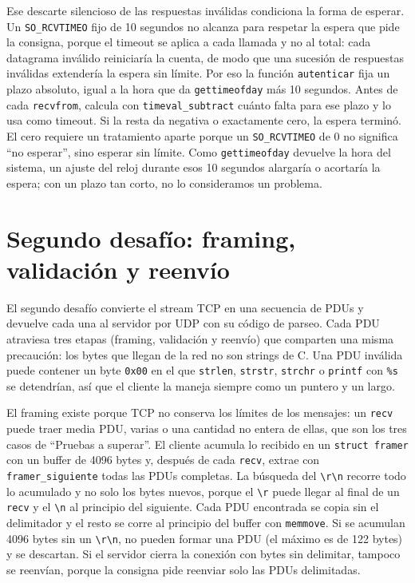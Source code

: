 \documentclass[11pt,a4paper]{article}
\newcommand{\code}[1]{\texttt{#1}}
\newcommand{\crlf}{\texttt{\textbackslash r\textbackslash n}}
\begin{document}
Ese descarte silencioso de las respuestas inválidas condiciona la forma de esperar. Un \code{SO\_RCVTIMEO} fijo de 10
segundos no alcanza para respetar la espera que pide la consigna, porque el timeout se aplica a cada llamada y no al
total: cada datagrama inválido reiniciaría la cuenta, de modo que una sucesión de respuestas inválidas extendería la espera sin
límite. Por eso la función \code{autenticar} fija un plazo absoluto, igual a la hora que da
\code{gettimeofday} más 10 segundos. Antes de cada \code{recvfrom}, calcula con \code{timeval\_subtract} cuánto falta para ese plazo y lo usa como timeout. Si la resta da negativa o exactamente cero, la
espera terminó. El cero requiere un tratamiento aparte porque un \code{SO\_RCVTIMEO} de 0 no significa ``no
esperar'', sino esperar sin límite. Como \code{gettimeofday} devuelve la hora del sistema, un ajuste del reloj durante
esos 10 segundos alargaría o acortaría la espera; con un plazo tan corto, no lo consideramos un problema.

\section{Segundo desafío: framing, validación y reenvío}
\label{sec:desafio2}

El segundo desafío convierte el stream TCP en una secuencia de PDUs y devuelve cada una al servidor por UDP con su
código de parseo. Cada PDU atraviesa tres etapas (framing, validación y reenvío) que comparten una misma precaución:
los bytes que llegan de la red no son strings de C. Una PDU inválida puede contener un byte \code{0x00} en
el que \code{strlen}, \code{strstr}, \code{strchr} o \code{printf} con \code{\%s} se detendrían, así que el cliente
la maneja siempre como un puntero y un largo.

El framing existe porque TCP no conserva los límites de los mensajes: un \code{recv} puede traer media PDU, varias o
una cantidad no entera de ellas, que son los tres casos de ``Pruebas a superar''. El cliente acumula lo recibido en
un \code{struct framer} con un buffer de 4096 bytes y, después de cada \code{recv}, extrae con
\code{framer\_siguiente} todas las PDUs completas. La búsqueda del \crlf{} recorre todo lo acumulado y no solo los
bytes nuevos, porque el \code{\textbackslash r} puede llegar al final de un \code{recv} y el \code{\textbackslash n}
al principio del siguiente. Cada PDU encontrada se copia sin el delimitador y el resto se corre al principio del
buffer con \code{memmove}. Si se acumulan 4096 bytes sin un \crlf, no pueden formar una PDU (el máximo es de 122
bytes) y se descartan. Si el servidor cierra la conexión con bytes sin delimitar, tampoco se reenvían, porque la
consigna pide reenviar solo las PDUs delimitadas.
\end{document}
